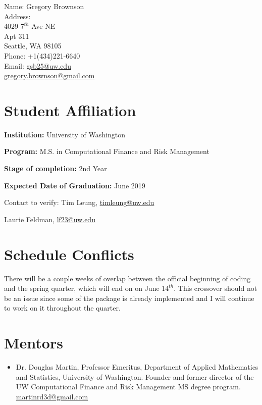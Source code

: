 \documentclass[english]{article}\usepackage[]{graphicx}\usepackage[]{color}
\begin{document}
Name: Gregory Brownson \\

Address: \\
4029 \( 7^{th} \) Ave NE \\
Apt 311 \\
Seattle, WA 98105 \\
Phone: +1(434)221-6640 \\
Email: \href{mailto:gsb25@uw.edu}{gsb25@uw.edu} \\
       \href{mailto:gregory.brownson@gmail.com}{gregory.brownson@gmail.com}

\section*{Student Affiliation}

\textbf{Institution:} University of Washington

\textbf{Program:} M.S. in Computational Finance and Risk Management

\textbf{Stage of completion:} 2nd Year

\textbf{Expected Date of Graduation:} June 2019

Contact to verify:
Tim Leung, \href{mailto:timleung@uw.edu}{timleung@uw.edu}

Laurie Feldman, \href{mailto:lf23@uw.edu}{lf23@uw.edu}

\section*{Schedule Conflicts}

There will be a couple weeks of overlap between the official beginning of coding and the spring quarter, which will end on on June \( 14^{th} \). This crossover should not be an issue since some of the package is already implemented and I will continue to work on it throughout the quarter.

\section*{Mentors}

\begin{itemize}
  \item Dr. Douglas Martin, Professor Emeritus, Department of Applied Mathematics and Statistics, University of Washington. Founder and former director    of the UW Computational Finance and Risk Management MS degree program. \\
  \href{mailto:martinrd3d@gmail.com}{martinrd3d@gmail.com}
\end{itemize}
\end{document}
